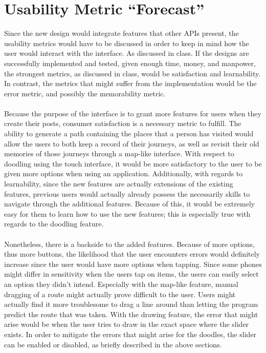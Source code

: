 \documentclass[11pt]{article}
\begin{document}
\section{Usability Metric ``Forecast''}
   \indent 
   \indent Since the new design would integrate features that other APIs present, the usability metrics would have to be discussed in order to keep in mind how the user would interact with the interface. As discussed in class. If the designs are successfully implemented and tested, given enough time, money, and manpower, the strongest metrics, as discussed in class, would be satisfaction and learnability. In contrast, the metrics that might suffer from the implementation would be the error metric, and possibly the memorability metric.\\ \\
   \indent Because the purpose of the interface is to grant more features for users when they create their posts, consumer satisfaction is a necessary metric to fulfill. The ability to generate a path containing the places that a person has visited would allow the users to both keep a record of their journeys, as well as revisit their old memories of those journeys through a map-like interface. With respect to doodling using the touch interface, it would be more satisfactory to the user to be given more options when using an application. Additionally, with regards to learnability, since the new features are actually extensions of the existing features, previous users would actually already possess the necessarily skills to navigate through the additional features. Because of this, it would be extremely easy for them to learn how to use the new features; this is especially true with regards to the doodling feature.\\ \\
   \indent Nonetheless, there is a backside to the added features. Because of more options, thus more buttons, the likelihood that the user encounters errors would definitely increase since the user would have more options when tapping. Since some phones might differ in sensitivity when the users tap on items, the users can easily select an option they didn't intend. Especially with the map-like feature, manual dragging of a route might actually prove difficult to the user. Users might actually find it more troublesome to drag a line around than letting the program predict the route that was taken. With the drawing feature, the error that might arise would be when the user tries to draw in the exact space where the slider exists. In order to mitigate the errors that might arise for the doodles, the slider can be enabled or disabled, as briefly described in the above sections.\\ \\

\clearpage


\end{document}
